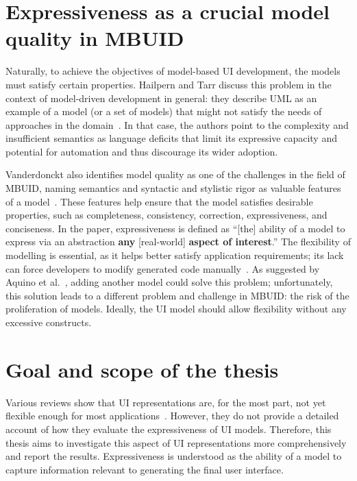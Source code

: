 \section{Expressiveness as a crucial model quality in MBUID}\label{sec:model-quality-in-mbuid}
Naturally, to achieve the objectives of model-based UI development, the models must satisfy certain properties.
Hailpern and Tarr discuss this problem in the context of model-driven development in general: they describe UML as an example of a model (or a set of models) that might not satisfy the needs of approaches in the domain~\cite{Hailpern2006}.
In that case, the authors point to the complexity and insufficient semantics as language deficits that limit its expressive capacity and potential for automation and thus discourage its wider adoption.

Vanderdonckt also identifies model quality as one of the challenges in the field of MBUID, naming semantics and syntactic and stylistic rigor as valuable features of a model~\cite{Vanderdonckt2008}.
These features help ensure that the model satisfies desirable properties, such as completeness, consistency, correction, expressiveness, and conciseness.
In the paper, expressiveness is defined as \enquote{[the] ability of a model to express via an abstraction \textbf{any} [real-world] \textbf{aspect of interest}.}
The flexibility of modelling is essential, as it helps better satisfy application requirements;
its lack can force developers to modify generated code manually~\cite{Pederiva2007}.
As suggested by Aquino et al.~\cite{Aquino2010}, adding another model could solve this problem;
unfortunately, this solution leads to a different problem and challenge in MBUID: the risk of the proliferation of models.
Ideally, the UI model should allow flexibility without any excessive constructs.

\section{Goal and scope of the thesis}\label{sec:goal-and-scope}

Various reviews show that UI representations are, for the most part, not yet flexible enough for most applications~\cite{Ruiz2018, Souchon2003}.
However, they do not provide a detailed account of how they evaluate the expressiveness of UI models.
Therefore, this thesis aims to investigate this aspect of UI representations more comprehensively and report the results.
Expressiveness is understood as the ability of a model to capture information relevant to generating the final user interface.

